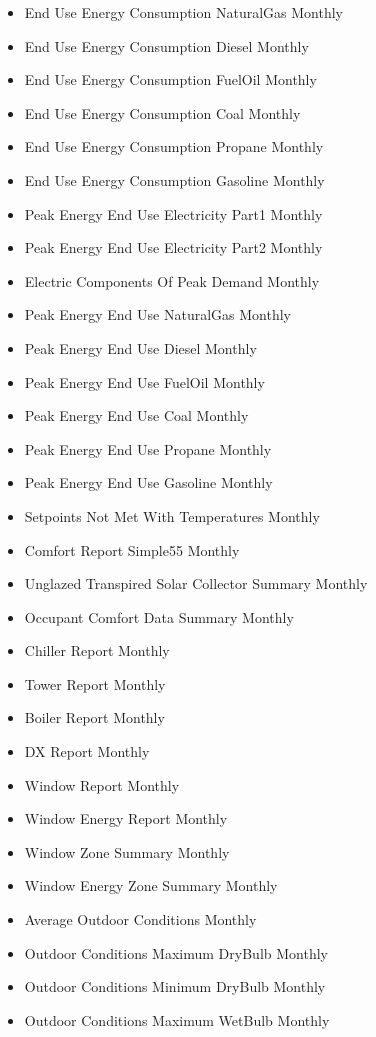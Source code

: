 \begin{itemize}
\item
  End Use Energy Consumption NaturalGas Monthly
\item
  End Use Energy Consumption Diesel Monthly
\item
  End Use Energy Consumption FuelOil Monthly
\item
  End Use Energy Consumption Coal Monthly
\item
  End Use Energy Consumption Propane Monthly
\item
  End Use Energy Consumption Gasoline Monthly
\item
  Peak Energy End Use Electricity Part1 Monthly
\item
  Peak Energy End Use Electricity Part2 Monthly
\item
  Electric Components Of Peak Demand Monthly
\item
  Peak Energy End Use NaturalGas Monthly
\item
  Peak Energy End Use Diesel Monthly
\item
  Peak Energy End Use FuelOil Monthly
\item
  Peak Energy End Use Coal Monthly
\item
  Peak Energy End Use Propane Monthly
\item
  Peak Energy End Use Gasoline Monthly
\item
  Setpoints Not Met With Temperatures Monthly
\item
  Comfort Report Simple55 Monthly
\item
  Unglazed Transpired Solar Collector Summary Monthly
\item
  Occupant Comfort Data Summary Monthly
\item
  Chiller Report Monthly
\item
  Tower Report Monthly
\item
  Boiler Report Monthly
\item
  DX Report Monthly
\item
  Window Report Monthly
\item
  Window Energy Report Monthly
\item
  Window Zone Summary Monthly
\item
  Window Energy Zone Summary Monthly
\item
  Average Outdoor Conditions Monthly
\item
  Outdoor Conditions Maximum DryBulb Monthly
\item
  Outdoor Conditions Minimum DryBulb Monthly
\item
  Outdoor Conditions Maximum WetBulb Monthly

\end{itemize}
